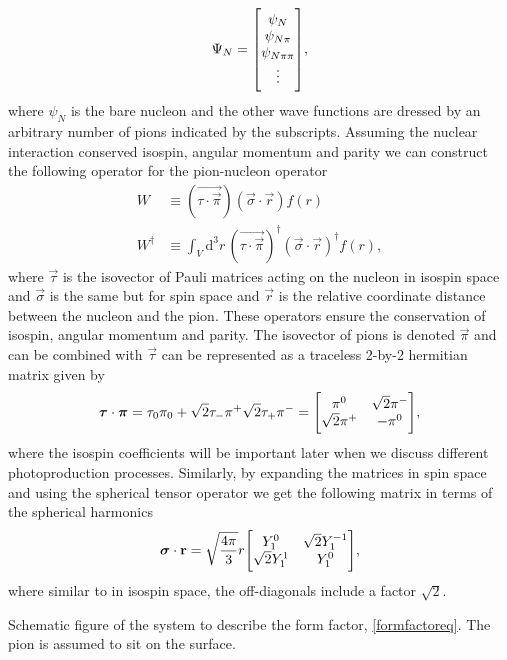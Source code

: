 \begin{equation} \label{superposition}
	\Psi_N = \mqty[\psi_{N} \\
	\psi_{N\pi} \\
	\psi_{N\pi\pi}\\
	\vdots],
\end{equation}
where $\psi_{N}$ is the bare nucleon and the other wave functions are dressed by an arbitrary number of pions indicated by the subscripts. Assuming the nuclear interaction conserved isospin, angular momentum and parity we can construct the following operator for the pion-nucleon operator
\begin{align} \label{W}
	W & \equiv (\vec{\tau\cdot\vec{\pi}})(\vec{\sigma}\cdot\vec{r})f(r) \\
	W^\dagger & \equiv  \int_V \text{d}^3 r \, (\vec{\tau\cdot\vec{\pi}})^\dagger (\vec{\sigma}\cdot\vec{r})^\dagger f(r) \label{Wdagger},
\end{align}
where $\vec{\tau}$ is the isovector of Pauli matrices acting on the nucleon in isospin space and $\vec{\sigma}$ is the same but for spin space and $\vec{r}$ is the relative coordinate distance between the nucleon and the pion. These operators ensure the conservation of isospin, angular momentum and parity. The isovector of pions is denoted $\vec{\pi}$ and can be combined with $\vec{\tau}$ can be represented as a traceless 2-by-2 hermitian matrix given by
\begin{equation} \label{isocoeff}
	\vec{\tau}\cdot \vec{\pi} = \tau_0  \pi_0+ \sqrt{2} \tau_{-}\pi^ +\sqrt{2}\tau_{+} \pi^{-} = \mqty[\pi^0 & \sqrt{2}\pi^- \\
	\sqrt{2}\pi^+ & -\pi^0],
\end{equation}
where the isospin coefficients will be important later when we discuss different photoproduction processes. Similarly, by expanding the matrices in spin space and using the spherical tensor operator we get the following matrix in terms of the spherical harmonics
\begin{equation}\label{spinmatrix}
	\vec{\sigma}\cdot \vec{r} = \sqrt{\frac{4\pi}{3}} r \mqty[Y_{1}^0 & \sqrt{2}Y_1^{-1} \\ \sqrt{2}Y_1^1 & Y_1^0],
\end{equation}
where similar to in isospin space, the off-diagonals include a factor $\sqrt{2}$.  
\begin{marginfigure}
	\centering
	
	\caption{Schematic figure of the system to describe the form factor, \eqref{formfactoreq}. The pion is assumed to sit on the surface.}
	\label{formfactor}
\end{marginfigure}
